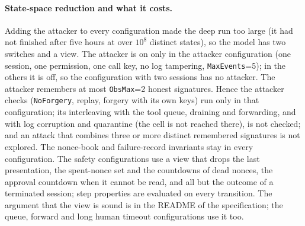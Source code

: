 \paragraph{State-space reduction and what it costs.} Adding the attacker to
every configuration made the deep run too large (it had not finished after
five hours at over $10^8$ distinct states), so the model has two switches and
a view. The attacker is on only in the attacker configuration (one session,
one permission, one call key, no log tampering, \texttt{MaxEvents}=5); in
the others it is off, so the configuration with two sessions has no attacker. The
attacker remembers at most \texttt{ObsMax}=2 honest signatures. Hence the
attacker checks (\texttt{NoForgery}, replay, forgery with its own keys) run
only in that configuration; its interleaving with the tool queue, draining
and forwarding, and with log corruption and quarantine (the cell is not
reached there), is not checked; and an attack that combines three or more
distinct remembered signatures is not explored. The nonce-book and
failure-record invariants stay in every configuration. The safety
configurations use a view that drops the last presentation, the spent-nonce
set and the countdowns of dead nonces, the approval countdown when it cannot
be read, and all but the outcome of a terminated session; step properties are
evaluated on every transition. The argument that the view is sound is in the
README of the specification; the queue, forward and long human timeout configurations use it too.

